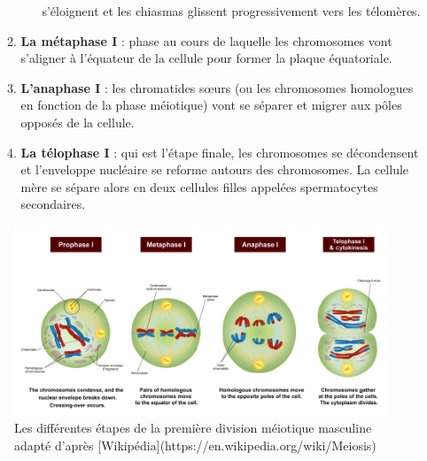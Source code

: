\documentclass[12pt,twoside]{reedthesis}
\theoremstyle{definition}
\theoremstyle{definition}
\theoremstyle{remark}
\begin{document}
\begin{enumerate}
\begin{enumerate}
\begin{enumerate}
        s'éloignent et les chiasmas glissent progressivement vers les
        télomères.\\
      \end{enumerate}
    \item
      \textbf{La métaphase I} : phase au cours de laquelle les chromosomes
      vont s'aligner à l'équateur de la cellule pour former la plaque
      équatoriale.
    \item
      \textbf{L'anaphase I} : les chromatides sœurs (ou les chromosomes
      homologues en fonction de la phase méiotique) vont se séparer et
      migrer aux pôles opposés de la cellule.\\
    \item
      \textbf{La télophase I} : qui est l'étape finale, les chromosomes se
      décondensent et l'enveloppe nucléaire se reforme autours des
      chromosomes. La cellule mère se sépare alors en deux cellules filles
      appelées spermatocytes secondaires.
    \end{enumerate}
  \end{enumerate}
  
  \begin{figure}
  
  {\centering \includegraphics[scale=0.43]{figure/MeiosisI} 
  
  }
  
  \caption[Les différentes étapes de la première division méiotique masculine adapté]{Les différentes étapes de la première division méiotique masculine adapté d'après [Wikipédia](https://en.wikipedia.org/wiki/Meiosis)}\label{fig:meiosei}
  \end{figure}
  
\end{document}
